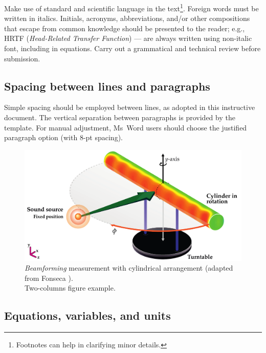 \documentclass[12pt, a4paper, twoside, twocolumn]{article}
\begin{document}
Make use of standard and scientific language in the text\footnote{Footnotes can help in clarifying minor details.}. Foreign words must be written in italics. Initials, acronyms, abbreviations, and/or other compositions that escape from common knowledge should be presented to the reader; e.g., HRTF (\textit{Head-Related Transfer Function}) --- are always written using non-italic font, including in equations. Carry out a grammatical and technical review before submission.

\subsection{Spacing between lines and paragraphs}

Simple spacing should be employed between lines, as adopted in this instructive document. The vertical separation between paragraphs is provided by the template. For manual adjustment, Ms~Word users should choose the justified paragraph option (with 8-pt spacing).


\begin{figure}[!ht] %
	\centering
	\includegraphics[width=0.74\linewidth]{figs/Measurement-Scheme-Fonseca-2013-en.pdf}%
	\caption{\textit{Beamforming} measurement with cylindrical arrangement (adapted from Fonseca \cite{Fonseca-2013}).\\ Two-columns figure example.}%
	\label{fig:beamforming}%
\end{figure}

\subsection{Equations, variables, and units}
\end{document}
